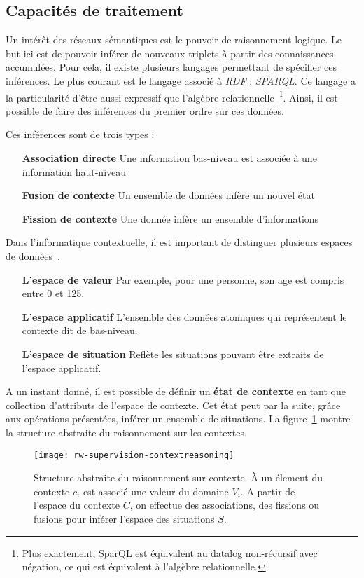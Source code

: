 \subsection{Capacités de traitement}
Un intérêt des réseaux sémantiques est le pouvoir de raisonnement logique. Le but ici est de pouvoir inférer de nouveaux triplets à partir des connaissances accumulées. Pour cela, il existe plusieurs langages permettant de spécifier ces inférences. Le plus courant est le langage associé à \textit{RDF} : \textit{SPARQL}. Ce langage a la particularité d'être aussi expressif que l'algèbre relationnelle~\cite{Angles:sparql}\footnote{Plus exactement, SparQL est équivalent au datalog non-récursif avec négation, ce qui est équivalent à l'algèbre relationnelle.}. Ainsi, il est possible de faire des inférences du premier ordre sur ces données.

Ces inférences sont de trois types :
\begin{itemize}
 \item[\textbf{Association directe}] Une information bas-niveau est associée à une information haut-niveau 
 \item[\textbf{Fusion de contexte}] Un ensemble de données infère un nouvel état 
 \item[\textbf{Fission de contexte}] Une donnée infère un ensemble d'informations
\end{itemize}

Dans l'informatique contextuelle, il est important de distinguer plusieurs espaces de données~\cite{Padovitz:agent}. 
\begin{itemize}
 \item[\textbf{L'espace de valeur}] Par exemple, pour une personne, son age est compris entre 0 et 125.
 \item[\textbf{L'espace applicatif}] L'ensemble des données atomiques qui représentent le contexte dit de bas-niveau.
 \item[\textbf{L'espace de situation}] Reflète les situations pouvant être extraits de l'espace applicatif.
\end{itemize}

A un instant donné, il est possible de définir un \textbf{état de contexte} en tant que collection d'attributs de l'espace de contexte. Cet état peut par la suite, grâce aux opérations présentées, inférer un ensemble de situations. La figure~\ref{rw-supervision-contextreasoning} montre la structure abstraite du raisonnement sur les contextes.
\begin{figure}[ht]
    \centering
    \texttt{[image: rw-supervision-contextreasoning]}
    \caption{Structure abstraite du raisonnement sur contexte. À un élement du contexte $c_i$ est associé une valeur du domaine $V_i$. A partir de l'espace du contexte $C$, on effectue des associations, des fissions ou fusions pour inférer l'espace des situations $S$.}\label{rw-supervision-contextreasoning}
\end{figure}

